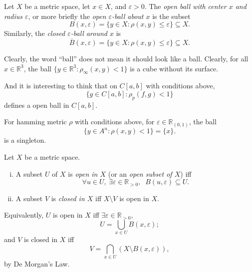 \begin{definition}
	Let $X$ be a metric space, let $x \in X$, and $\varepsilon > 0$. The \textit{open ball with center $x$ and radius $\varepsilon$}, or more briefly the \textit{open $\varepsilon$-ball about $x$} is the subset
	$$
	B(x, \varepsilon) = \{ y \in X: \rho (x,y) \le \varepsilon \} \subseteq X.
	$$
	Similarly, the \textit{closed $\varepsilon$-ball around $x$} is
	$$
	\overline B (x, \varepsilon) = \{ y \in X: \rho(x,y) \le \varepsilon \} \subseteq X.
	$$
\end{definition}


\begin{note}
	Clearly, the word ``ball'' does not mean it should look like a ball. Clearly, for all $x \in \mathbb R^3$, the ball $\{ y \in \mathbb R^3 : \rho_\infty (x,y) < 1 \}$ is a cube without its surface.
	
	And it is interesting to think that on $C[a,b]$ with conditions above,
	$$
	\{ g \in C[a,b] : \rho_p(f,g) < 1 \}
	$$
	defines a open ball in $C[a,b]$.
	
	
\end{note}


\begin{note}
	For hamming metric $\rho$ with conditions above, for $\varepsilon \in \mathbb R_{(0,1)}$, the ball
	$$
	\{ y \in A^n : \rho(x,y) < 1 \} = \{x\}.
	$$
	is a singleton.
\end{note}


\begin{definition}
	Let $X$ be a metric space.
	\begin{enumerate}[(i)]
		\item A subset $U$ of $X$ is \textit{open in $X$} (or an \textit{open subset of $X$}) iff
		$$
		\forall u \in U, \ \exists \varepsilon \in \mathbb R_{> 0} , \;\; B(u, \varepsilon ) \subseteq U.
		$$
		\item A subset $V$ is \textit{closed in $X$} iff $X\setminus V$ is open in $X$.
	\end{enumerate}
\end{definition}


\begin{note}
	Equivalently, $U$ is open in $X$ iff $\exists \varepsilon \in \mathbb R_{>0}$,
	$$
	U = \bigcup_{x \in U} B(x, \varepsilon );
	$$
	and $V$ is closed in $X$ iff
	$$
	V = \bigcap_{x \in U} (X \setminus B(x, \varepsilon)),
	$$
	by De Morgan's Law.
\end{note}


